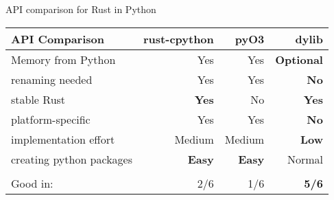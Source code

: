 \begin{frame}[c]{API comparison for Rust in Python}
    \normalsize

\begin{tabular}{@{}lrrr@{}}
    \textbf{API Comparison} & rust-cpython & pyO3 & dylib \\
    \hline \pause
    Memory from Python              & Yes           & Yes & \textbf{Optional} \\ \pause
    renaming needed                 & Yes           & Yes & \textbf{No} \\ \pause
    stable Rust                     & \textbf{Yes}  & No  & \textbf{Yes} \\ \pause
    platform-specific               & Yes           & Yes & \textbf{No} \\ \pause
    implementation effort           & Medium        & Medium & \textbf{Low} \\ \pause
    creating python packages        & \textbf{Easy} & \textbf{Easy} & Normal \pause \\ \\
    \hline
    Good in: & 2/6 & 1/6 & \textbf{5/6} \\
\end{tabular}
\end{frame}





